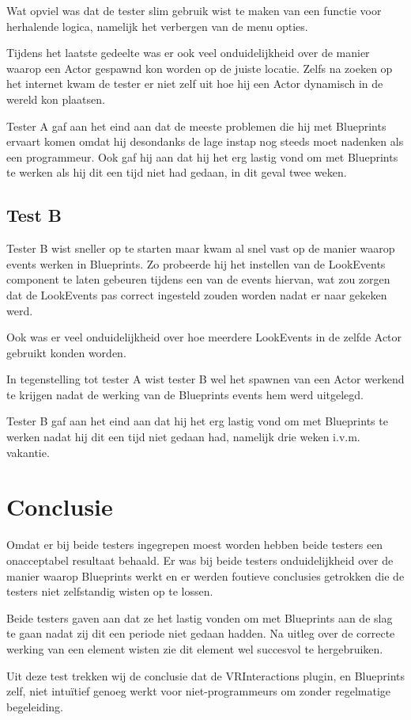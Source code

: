Wat opviel was dat de tester slim gebruik wist te maken van een functie voor herhalende logica, namelijk het verbergen van de menu opties. 

Tijdens het laatste gedeelte was er ook veel onduidelijkheid over de manier waarop een Actor gespawnd kon worden op de juiste locatie. Zelfs na zoeken op het internet kwam de tester er niet zelf uit hoe hij een Actor dynamisch in de wereld kon plaatsen.

Tester A gaf aan het eind aan dat de meeste problemen die hij met Blueprints ervaart komen omdat hij desondanks de lage instap nog steeds moet nadenken als een programmeur. Ook gaf hij aan dat hij het erg lastig vond om met Blueprints te werken als hij dit een tijd niet had gedaan, in dit geval twee weken.

\subsection{Test B}
Tester B wist sneller op te starten maar kwam al snel vast op de manier waarop events werken in Blueprints. Zo probeerde hij het instellen van de LookEvents component te laten gebeuren tijdens een van de events hiervan, wat zou zorgen dat de LookEvents pas correct ingesteld zouden worden nadat er naar gekeken werd.

Ook was er veel onduidelijkheid over hoe meerdere LookEvents in de zelfde Actor gebruikt konden worden. 

In tegenstelling tot tester A wist tester B wel het spawnen van een Actor werkend te krijgen nadat de werking van de Blueprints events hem werd uitgelegd.

Tester B gaf aan het eind aan dat hij het erg lastig vond om met Blueprints te werken nadat hij dit een tijd niet gedaan had, namelijk drie weken i.v.m. vakantie.

\section{Conclusie}
Omdat er bij beide testers ingegrepen moest worden hebben beide testers een onacceptabel resultaat behaald. Er was bij beide testers onduidelijkheid over de manier waarop Blueprints werkt en er werden foutieve conclusies getrokken die de testers niet zelfstandig wisten op te lossen.

Beide testers gaven aan dat ze het lastig vonden om met Blueprints aan de slag te gaan nadat zij dit een periode niet gedaan hadden. Na uitleg over de correcte werking van een element wisten zie dit element wel succesvol te hergebruiken.

Uit deze test trekken wij de conclusie dat de VRInteractions plugin, en Blueprints zelf, niet intuïtief genoeg werkt voor niet-programmeurs om zonder regelmatige begeleiding.